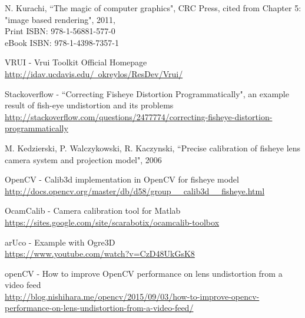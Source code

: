 \begin{thebibliography}{99}
N. Kurachi, 
``The magic of computer graphics", CRC Press, cited from Chapter 5: "image based rendering", 2011,\\
Print ISBN: 978-1-56881-577-0\\
eBook ISBN: 978-1-4398-7357-1

VRUI - Vrui Toolkit Official Homepage \\ \href{http://idav.ucdavis.edu/~okreylos/ResDev/Vrui/}{http://idav.ucdavis.edu/~okreylos/ResDev/Vrui/}

Stackoverflow - ``Correcting Fisheye Distortion Programmatically", an example result of fish-eye undistortion and its problems \\ \href{http://stackoverflow.com/questions/2477774/correcting-fisheye-distortion-programmatically}{http://stackoverflow.com/questions/2477774/correcting-fisheye-distortion-programmatically}

M. Kedzierski, P. Walczykowski, R. Kaczynski,
``Precise calibration of fisheye lens camera system and projection model", 2006

OpenCV - Calib3d implementation in OpenCV for fisheye model \\ \href{http://docs.opencv.org/master/db/d58/group_\_calib3d_\_fisheye.html}{http://docs.opencv.org/master/db/d58/group\_\_calib3d\_\_fisheye.html}


OcamCalib - Camera calibration tool for Matlab \\ \href{https://sites.google.com/site/scarabotix/ocamcalib-toolbox}{https://sites.google.com/site/scarabotix/ocamcalib-toolbox}

arUco - Example with Ogre3D \\ \href{https://www.youtube.com/watch?v=CzD48UkGsK8}{https://www.youtube.com/watch?v=CzD48UkGsK8}

openCV - How to improve OpenCV performance on lens undistortion from a video feed \\ \href{http://blog.nishihara.me/opencv/2015/09/03/how-to-improve-opencv-performance-on-lens-undistortion-from-a-video-feed/}{http://blog.nishihara.me/opencv/2015/09/03/how-to-improve-opencv-performance-on-lens-undistortion-from-a-video-feed/}


\iffalse
\fi


\end{thebibliography}
